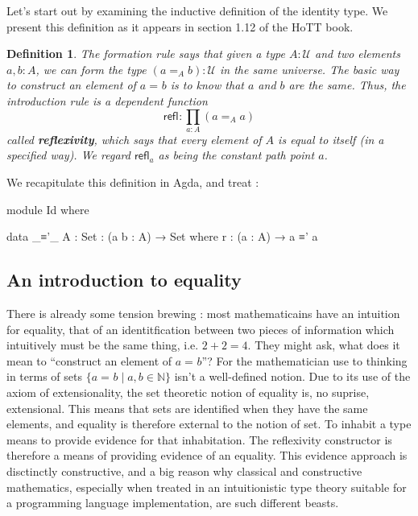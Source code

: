 \documentclass[11pt, a4paper]{article}
\newtheorem{definition}{Definition} \newtheorem{lem}{Lemma}
\newcommand{\refl}[1]{\ensuremath{\mathsf{refl}_{#1}}\xspace}
\newcommand{\define}[1]{\textbf{#1}} \newcommand{\defeq}{\vcentcolon\equiv} %
\newcommand{\id}[3][]{\ensuremath{#2 =_{#1} #3}\xspace}
\newcommand{\UU}{\ensuremath{\mathcal{U}}\xspace} \let\bbU\UU \let\type\UU
\begin{document}
Let's start out by examining the inductive definition of the identity type. We
present this definition as it appears in section 1.12 of the HoTT book.

\begin{definition} The formation rule says that given a type $A:\UU$ and two
elements $a,b:A$, we can form the type $(\id[A]{a}{b}):\UU$ in the same
universe. The basic way to construct an element of $\id{a}{b}$ is to know that
$a$ and $b$ are the same. Thus, the introduction rule is a dependent function
  \[\refl{} : \prod_{a:A} (\id[A]{a}{a}) \] called \define{reflexivity}, which
says that every element of $A$ is equal to itself (in a specified way). We
regard $\refl{a}$ as being the constant path
point $a$.
\end{definition}

We recapitulate this definition in Agda, and treat :

\begin{code}[hide]

module Id where

\end{code}
\begin{code}

  data _≡'_ {A : Set} : (a b : A) → Set where r : (a : A) → a ≡' a

\end{code}

\subsection{An introduction to equality}

There is already some tension brewing : most mathematicains have an intuition
for equality, that of an identitfication between two pieces of information which
intuitively must be the same thing, i.e. $2+2=4$. They might ask, what does it
mean to ``construct an element of $\id{a}{b}$''? For the mathematician use to
thinking in terms of sets $\{\id{a}{b} \mid a,b \in \mathbb{N} \}$ isn't a
well-defined notion. Due to its use of the axiom of extensionality, the set
theoretic notion of equality is, no suprise, extensional. This means that sets
are identified when they have the same elements, and equality is therefore
external to the notion of set. To inhabit a type means to provide evidence for
that inhabitation. The reflexivity constructor is therefore a means of providing
evidence of an equality. This evidence approach is disctinctly constructive, and
a big reason why classical and constructive mathematics, especially when treated
in an intuitionistic type theory suitable for a programming language
implementation, are such different beasts.
\end{document}
